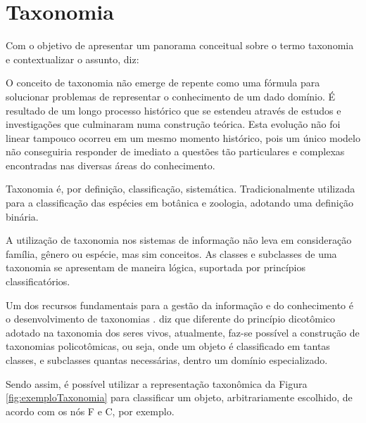 \section{Taxonomia}
\label{sec:taxonomia}
Com o objetivo de apresentar um panorama conceitual sobre o termo taxonomia e contextualizar o assunto,  diz:

\hspace{4cm}
\begin{minipage}{.66\textwidth}		
    \begin{singlespace}
        \fontsize{10}{12}\selectfont O conceito de taxonomia não emerge de repente como uma fórmula para solucionar problemas de representar o conhecimento de um dado domínio.
        É resultado de um longo processo histórico que se estendeu através de estudos e investigações que culminaram numa construção teórica.
        Esta evolução não foi linear tampouco ocorreu em um mesmo momento histórico, pois um único modelo não conseguiria responder de imediato a questões tão particulares 
        e complexas encontradas nas diversas áreas do conhecimento.
        \end{singlespace}
\end{minipage}
\vspace{0.3CM}

Taxonomia é, por definição, classificação, sistemática. Tradicionalmente utilizada para a classificação das espécies em botânica e zoologia, adotando uma definição binária.
\par
A utilização de taxonomia nos sistemas de informação não leva em consideração família, gênero ou espécie, mas sim conceitos.
As classes e subclasses de uma taxonomia se apresentam de maneira lógica, suportada por princípios classificatórios.\cite{campos2012taxonomia}
\par
Um dos recursos fundamentais para a gestão da informação e do conhecimento é o desenvolvimento de taxonomias \cite{dal2015ferramentas}.
 diz que diferente do princípio dicotômico adotado na taxonomia dos seres vivos, atualmente, faz-se possível a construção de taxonomias
policotômicas, ou seja, onde um objeto é classificado em tantas classes, e subclasses quantas necessárias, dentro um domínio especializado.
\par
Sendo assim, é possível utilizar a representação taxonômica da Figura \ref{fig:exemploTaxonomia} para classificar um objeto, arbitrariamente escolhido,
de acordo com os nós F e C, por exemplo.

